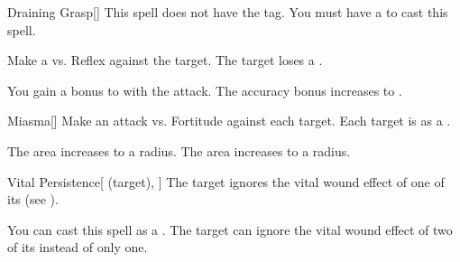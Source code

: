 \lowercase{\hypertarget{spell:Draining Grasp}{}}\label{spell:Draining Grasp}
\begin{freeability}[Rank 3]{\hypertarget{spell:Draining Grasp}{Draining Grasp}}[]
This spell does not have the  tag.
You must have a  to cast this spell.

Make a  vs. Reflex against the target.
\hit The target loses a .

\rankline
{} You gain a  bonus to  with the attack.
 The accuracy bonus increases to .
\end{freeability}
\vspace{0.25em}



\lowercase{\hypertarget{spell:Miasma}{}}\label{spell:Miasma}
\begin{freeability}[Rank 3]{\hypertarget{spell:Miasma}{Miasma}}[]
Make an attack vs. Fortitude against each target.
\hit Each target is  as a .

\rankline
{} The area increases to a \arealarge radius.
 The area increases to a \areahuge radius.
\end{freeability}
\vspace{0.25em}



\lowercase{\hypertarget{spell:Vital Persistence}{}}\label{spell:Vital Persistence}
\begin{attuneability}[Rank 3]{\hypertarget{spell:Vital Persistence}{Vital Persistence}}[ (target), ]
The target ignores the vital wound effect of one of its  (see ).

\rankline
{} You can cast this spell as a .
 The target can ignore the vital wound effect of two of its  instead of only one.
\end{attuneability}
\vspace{0.25em}



